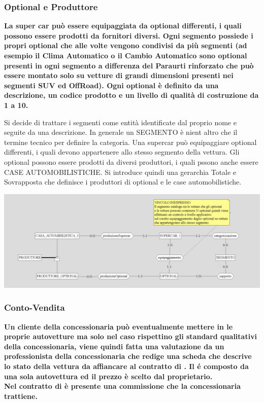 \documentclass[11pt]{article}
\begin{document}
\subsubsection{Optional e Produttore}
\textbf{La super car può essere equipaggiata da optional differenti, i quali
possono essere prodotti da fornitori diversi. Ogni segmento possiede i propri
optional che alle volte vengono condivisi da più segmenti (ad esempio il Clima
Automatico o il Cambio Automatico sono optional presenti in ogni segmento a
differenza del Paraurti rinforzato che può essere montato solo su vetture di
grandi dimensioni presenti nei segmenti SUV ed OffRoad). Ogni optional è
definito da una descrizione, un codice prodotto e un livello di qualità di
costruzione da 1 a 10.}

Si decide di trattare i segmenti come entità identificate dal proprio nome e
seguite da una descrizione. In generale un SEGMENTO è nient altro che il termine
tecnico per definire la categoria. Una supercar può equipaggiare optional
differenti, i quali devono appartenere allo stesso segmento della vettura. Gli
optional possono essere prodotti da diversi produttori, i quali pssono anche
essere CASE AUTOMOBILISTICHE. Si introduce quindi una gerarchia Totale e
Sovrapposta che definisce i produttori di optional e le case automobilistiche.

\begin{center}
    \includegraphics[width=\linewidth]{images/optional.png}
\end{center}

\subsubsection{Conto-Vendita}
\textbf{Un cliente della concessionaria può eventualmente mettere in
 le proprie autovetture ma solo nel caso rispettino
gli standard qualitativi della concessionaria, viene quindi fatta una
valutazione da un professionista della concessionaria che redige una scheda che
descrive lo stato della vettura da affiancare al contratto di
. Il  é composto da una
sola autovettura ed il prezzo è scelto dal proprietario.\\ 
Nel contratto di  è presente una commissione che la
concessionaria trattiene.}
\end{document}
